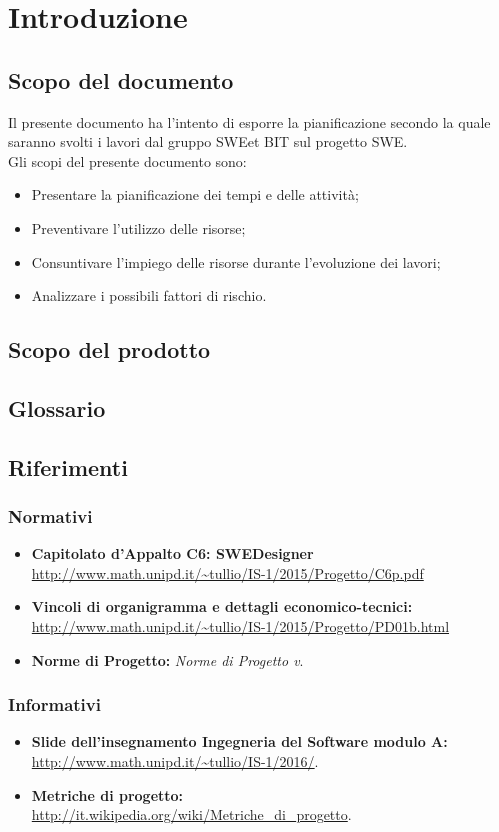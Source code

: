 \section{Introduzione}
\subsection{Scopo del documento}
Il presente documento ha l'intento di esporre la pianificazione secondo la quale saranno svolti i lavori dal gruppo SWEet BIT sul progetto SWE. \\
Gli scopi del presente documento sono: \\
\begin{itemize}
	\item Presentare la pianificazione dei tempi e delle attività;
	\item Preventivare l'utilizzo delle risorse;
	\item Consuntivare l'impiego delle risorse durante l'evoluzione dei lavori;
	\item Analizzare i possibili fattori di rischio. \\
\end{itemize}
\subsection{Scopo del prodotto}
\subsection{Glossario}
\subsection{Riferimenti}
\subsubsection{Normativi}
\begin{itemize}
	\item \textbf{Capitolato d'Appalto C6: SWEDesigner} \\
		\url{http://www.math.unipd.it/~tullio/IS-1/2015/Progetto/C6p.pdf} \\
	\item \textbf{Vincoli di organigramma e dettagli economico-tecnici:} \\
		\url{http://www.math.unipd.it/~tullio/IS-1/2015/Progetto/PD01b.html} \\
	\item \textbf{Norme di Progetto:} \textit{Norme di Progetto v\VersioneNP}. \\
\end{itemize}
\subsubsection{Informativi}
\begin{itemize}
	\item \textbf{Slide dell'insegnamento Ingegneria del Software modulo A:} \\
		\url{http://www.math.unipd.it/~tullio/IS-1/2016/}. \\
	\item \textbf{Metriche di progetto:} \\
		\url{http://it.wikipedia.org/wiki/Metriche_di_progetto}. \\
\end{itemize}


